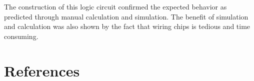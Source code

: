\documentclass[12pt]{article}
\begin{document}
The construction of this logic circuit confirmed the expected behavior
as predicted through manual calculation and simulation.
The benefit of simulation and calculation was also shown by the
fact that wiring chips is tedious and time consuming.


\renewcommand*{\refname}{\vspace{-8mm}}
\section{References}
%
%



\end{document}
